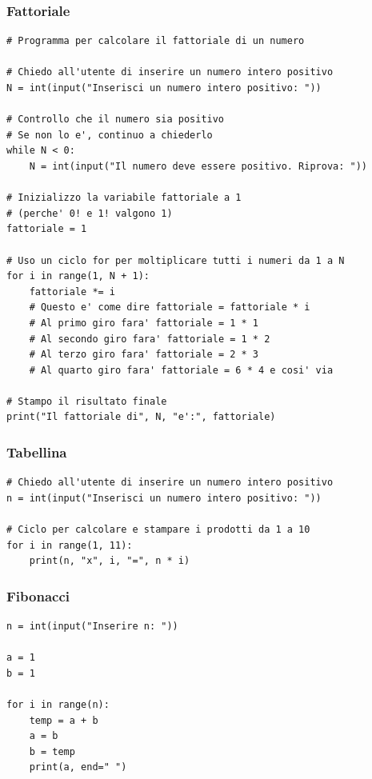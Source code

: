 \documentclass[a4paper,12pt]{article}
\begin{document}
\newpage
\subsubsection{Fattoriale}

\begin{lstlisting}
# Programma per calcolare il fattoriale di un numero

# Chiedo all'utente di inserire un numero intero positivo
N = int(input("Inserisci un numero intero positivo: "))

# Controllo che il numero sia positivo
# Se non lo e', continuo a chiederlo
while N < 0:
	N = int(input("Il numero deve essere positivo. Riprova: "))

# Inizializzo la variabile fattoriale a 1
# (perche' 0! e 1! valgono 1)
fattoriale = 1

# Uso un ciclo for per moltiplicare tutti i numeri da 1 a N
for i in range(1, N + 1):
	fattoriale *= i
	# Questo e' come dire fattoriale = fattoriale * i
	# Al primo giro fara' fattoriale = 1 * 1
	# Al secondo giro fara' fattoriale = 1 * 2
	# Al terzo giro fara' fattoriale = 2 * 3
	# Al quarto giro fara' fattoriale = 6 * 4 e cosi' via
	
# Stampo il risultato finale
print("Il fattoriale di", N, "e':", fattoriale)

\end{lstlisting}

\newpage
\subsubsection{Tabellina}

\begin{lstlisting}
# Chiedo all'utente di inserire un numero intero positivo
n = int(input("Inserisci un numero intero positivo: "))

# Ciclo per calcolare e stampare i prodotti da 1 a 10
for i in range(1, 11):
	print(n, "x", i, "=", n * i)

\end{lstlisting}


\subsubsection{Fibonacci}

\begin{lstlisting}
n = int(input("Inserire n: "))

a = 1
b = 1

for i in range(n):
	temp = a + b
	a = b
	b = temp
	print(a, end=" ")

\end{lstlisting}
\end{document}
